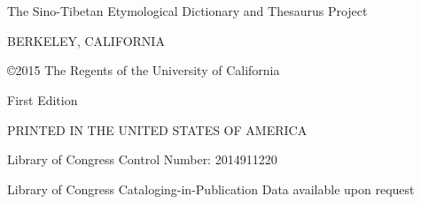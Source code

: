 \chapter*{}
\vspace{25em}
\thispagestyle{empty}
\begin{center}
The Sino-Tibetan Etymological Dictionary and Thesaurus Project

BERKELEY, CALIFORNIA

\copyright 2015 The Regents of the University of California

First Edition

PRINTED IN THE UNITED STATES OF AMERICA

Library of Congress Control Number:  2014911220

Library of Congress Cataloging-in-Publication Data available upon request

\vspace{10em}
\date{Compiled on \today\ at \currenttime}
\end{center}



